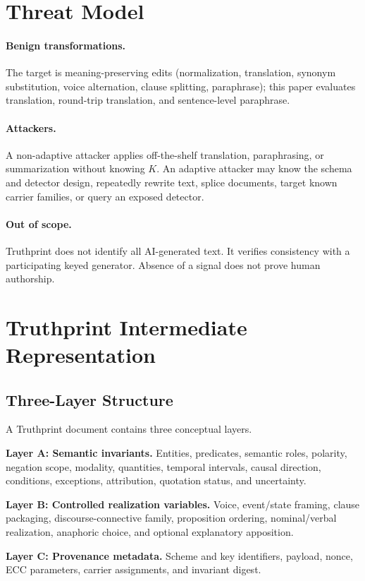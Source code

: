 \documentclass[journal]{IEEEtran}
\begin{document}
\section{Threat Model}
\paragraph{Benign transformations.} The target is meaning-preserving edits (normalization, translation, synonym substitution, voice alternation, clause splitting, paraphrase); this paper evaluates translation, round-trip translation, and sentence-level paraphrase.

\paragraph{Attackers.} A non-adaptive attacker applies off-the-shelf translation, paraphrasing, or summarization without knowing $K$. An adaptive attacker may know the schema and detector design, repeatedly rewrite text, splice documents, target known carrier families, or query an exposed detector.

\paragraph{Out of scope.} Truthprint does not identify all AI-generated text. It verifies consistency with a participating keyed generator. Absence of a signal does not prove human authorship.

\section{Truthprint Intermediate Representation}
\subsection{Three-Layer Structure}
A Truthprint document contains three conceptual layers.

\textbf{Layer A: Semantic invariants.} Entities, predicates, semantic roles, polarity, negation scope, modality, quantities, temporal intervals, causal direction, conditions, exceptions, attribution, quotation status, and uncertainty.

\textbf{Layer B: Controlled realization variables.} Voice, event/state framing, clause packaging, discourse-connective family, proposition ordering, nominal/verbal realization, anaphoric choice, and optional explanatory apposition.

\textbf{Layer C: Provenance metadata.} Scheme and key identifiers, payload, nonce, ECC parameters, carrier assignments, and invariant digest.
\end{document}
